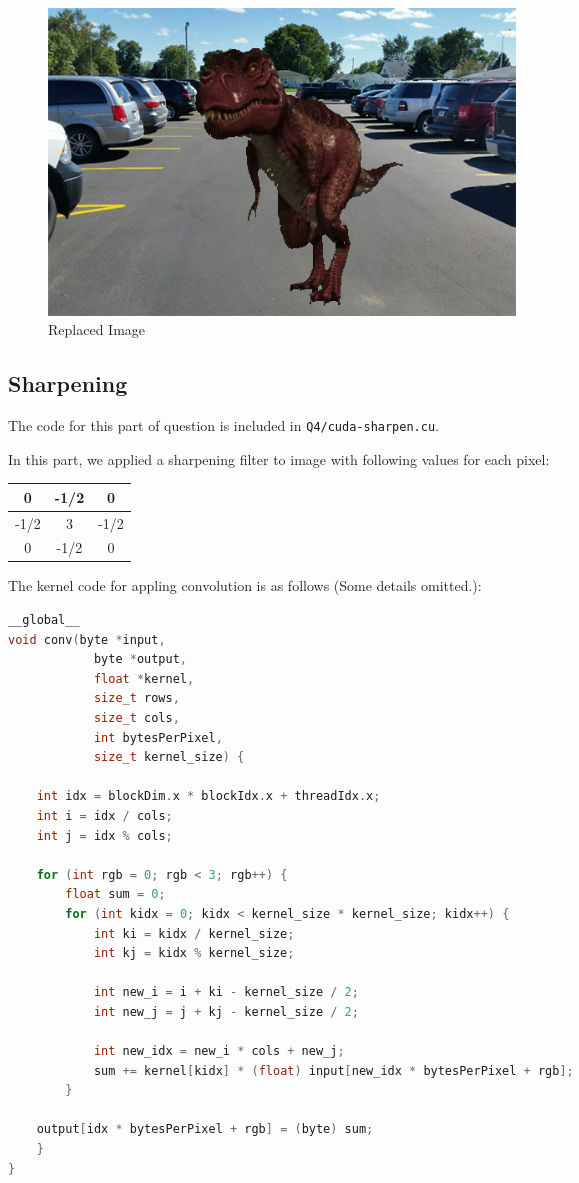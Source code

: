 \documentclass[12pt]{article}
\begin{document}
\begin{figure}[H]
	\centering
	\includegraphics[width=0.6\textwidth]{./images/Q4/replaced.bmp}	
	\cprotect\caption{Replaced Image}
	\label{fig:3-1}
\end{figure}

\subsection{Sharpening}

The code for this part of question is included in \verb+Q4/cuda-sharpen.cu+.

In this part, we applied a sharpening filter to image with following values for each pixel:

\begin{table}[ht!]
	\centering
	\begin{tabular}{|c|c|c|}
		\hline
		0 & -1/2 & 0 \\ \hline
		 -1/2 & 3 &  -1/2 \\ \hline
		0 &  -1/2 & 0 \\ \hline
	\end{tabular}
\end{table}

The kernel code for appling convolution is as follows (Some details omitted.):

\begin{lstlisting}[language=c++]
__global__
void conv(byte *input,
			byte *output,
			float *kernel,
			size_t rows,
			size_t cols,
			int bytesPerPixel,
			size_t kernel_size) {
	
	int idx = blockDim.x * blockIdx.x + threadIdx.x;
	int i = idx / cols;
	int j = idx % cols;
	
	for (int rgb = 0; rgb < 3; rgb++) {
		float sum = 0;
		for (int kidx = 0; kidx < kernel_size * kernel_size; kidx++) {
			int ki = kidx / kernel_size;
			int kj = kidx % kernel_size;
			
			int new_i = i + ki - kernel_size / 2;
			int new_j = j + kj - kernel_size / 2;
		
			int new_idx = new_i * cols + new_j;
			sum += kernel[kidx] * (float) input[new_idx * bytesPerPixel + rgb];
		}
	
	output[idx * bytesPerPixel + rgb] = (byte) sum;
	}
}
\end{lstlisting}
\end{document}

